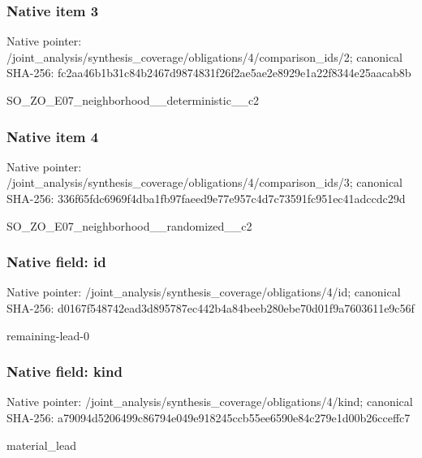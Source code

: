 \documentclass[10pt,a4paper]{article}
\begin{document}
\subsubsection{Native item 3}
Native pointer: /joint\_\allowbreak{}analysis/synthesis\_\allowbreak{}coverage/obligations/4/comparison\_\allowbreak{}ids/2; canonical SHA-256: fc2aa46b1b31c84b2467d9874831f26f2ae5ae2e8929e1a22f8344e25aacab8b

\begingroup\raggedright\sloppy SO\_\allowbreak{}ZO\_\allowbreak{}E07\_\allowbreak{}neighborhood\_\allowbreak{}\_\allowbreak{}deterministic\_\allowbreak{}\_\allowbreak{}c2\par\endgroup

\subsubsection{Native item 4}
Native pointer: /joint\_\allowbreak{}analysis/synthesis\_\allowbreak{}coverage/obligations/4/comparison\_\allowbreak{}ids/3; canonical SHA-256: 336f65fdc6969f4dba1fb97faeed9e77e957c4d7c73591fc951ec41adccdc29d

\begingroup\raggedright\sloppy SO\_\allowbreak{}ZO\_\allowbreak{}E07\_\allowbreak{}neighborhood\_\allowbreak{}\_\allowbreak{}randomized\_\allowbreak{}\_\allowbreak{}c2\par\endgroup

\subsubsection{Native field: id}
Native pointer: /joint\_\allowbreak{}analysis/synthesis\_\allowbreak{}coverage/obligations/4/id; canonical SHA-256: d0167f548742ead3d895787ec442b4a84beeb280ebe70d01f9a7603611e9c56f

\begingroup\raggedright\sloppy remaining-lead-0\par\endgroup

\subsubsection{Native field: kind}
Native pointer: /joint\_\allowbreak{}analysis/synthesis\_\allowbreak{}coverage/obligations/4/kind; canonical SHA-256: a79094d5206499c86794e049e918245ccb55ee6590e84c279e1d00b26cceffc7

\begingroup\raggedright\sloppy material\_\allowbreak{}lead\par\endgroup
\end{document}
